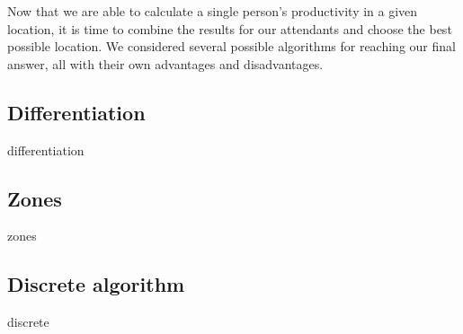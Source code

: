 
Now that we are able to calculate a single person's productivity in a given location, it is time to combine the results for our attendants and choose the best possible location. We considered several possible algorithms for reaching our final answer, all with their own advantages and disadvantages. 

\subsection{Differentiation}
{differentiation}

\subsection{Zones}
{zones}

\subsection{Discrete algorithm} \label{subsec:discrete}
{discrete}

